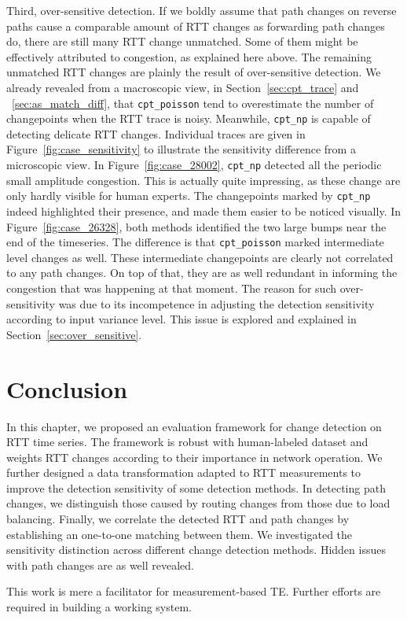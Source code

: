 Third, over-sensitive detection.
If we boldly assume that path changes on reverse paths cause a comparable amount of RTT changes as forwarding path changes do, there are still many RTT change unmatched.
Some of them might be effectively attributed to congestion, as explained here above.
The remaining unmatched RTT changes are plainly the result of over-sensitive detection.
We already revealed from a macroscopic view, in Section~\ref{sec:cpt_trace} and ~\ref{sec:as_match_diff}, that \texttt{cpt\_poisson} tend to overestimate the number of changepoints when the RTT trace is noisy.
Meanwhile, \texttt{cpt\_np} is capable of detecting delicate RTT changes. 
Individual traces are given in Figure~\ref{fig:case_sensitivity} to illustrate the sensitivity difference from a microscopic view. 
In Figure~\ref{fig:case_28002}, \texttt{cpt\_np} detected all the periodic small amplitude congestion.
This is actually quite impressing, as these change are only hardly visible for human experts.
The changepoints marked by \texttt{cpt\_np} indeed highlighted their presence, and made them easier to be noticed visually.
In Figure~\ref{fig:case_26328}, both methods identified the two large bumps near the end of the timeseries.
The difference is that \texttt{cpt\_poisson} marked intermediate level changes as well.
These intermediate changepoints are clearly not correlated to any path changes.
On top of that, they are as well redundant in informing the congestion that was happening at that moment.
The reason for such over-sensitivity was due to its incompetence in adjusting the detection sensitivity according to input variance level. This issue is explored and explained in Section~\ref{sec:over_sensitive}.

\section*{Conclusion}
In this chapter, we proposed an evaluation framework for change detection on RTT time series.
The framework is robust with human-labeled dataset and weights RTT changes according to their importance in network operation. 
We further designed a data transformation adapted to RTT measurements to improve the detection sensitivity of some detection methods.
In detecting path changes, we distinguish those caused by routing changes from those due to load balancing.
Finally, we correlate the detected RTT and path changes by establishing an one-to-one matching between them. 
We investigated the sensitivity distinction across different change detection methods. 
Hidden issues with path changes are as well revealed.

This work is mere a facilitator for measurement-based TE. 
Further efforts are required in building a working system.
